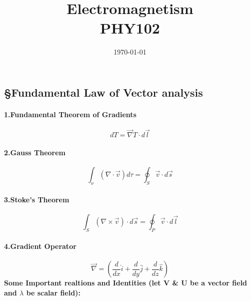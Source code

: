 \documentclass[a4paper]{article}
\numberwithin{equation}{subsection}  %
\begin{document}
	\title{\bf Electromagnetism\\ 
		\large PHY102 } 
	\author{}
	\date{\today}
	\maketitle
	\begin{center}
		\subsection*{\S Fundamental Law of Vector analysis}
	\end{center}
\paragraph{1.Fundamental Theorem of Gradients}
\begin{equation}
	dT = \vec{\nabla} T \cdot d\vec{l
}\end{equation}
\paragraph{2.Gauss Theorem}
\begin{equation}
	\int_{\nu} (\nabla \cdot \vec{v})d\tau = \oint_{S} \vec{v}\cdot d \vec{s} 
\end{equation}
\paragraph{3.Stoke's Theorem}
\begin{equation}
\int_{S} (\nabla \times \vec{v})\cdot d\vec{s} = \oint_{P} \vec{v}\cdot d \vec{l} 
\end{equation}
\paragraph{4.Gradient Operator}
\begin{equation}
\vec{\nabla} = (\frac{d}{dx}\hat{i}+\frac{d}{dy}\hat{j}+\frac{d}{dz}\hat{k})
\end{equation}
\textbf{Some Important realtions and Identities (let V \& U be a vector field and $\lambda$ be scalar field):}
\end{document}
